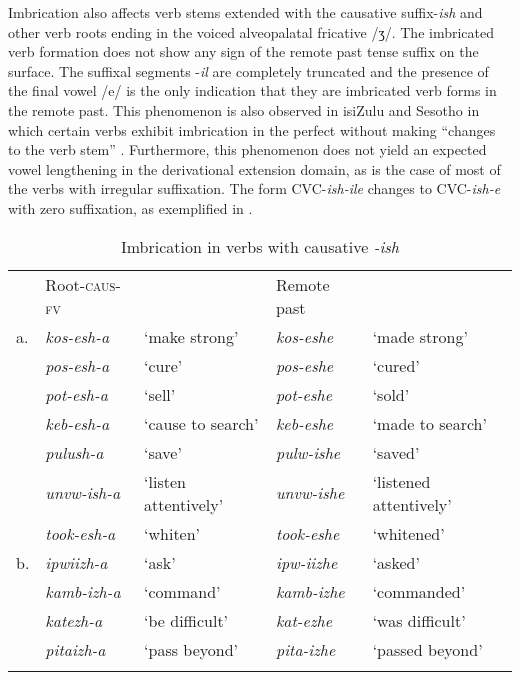 \documentclass[output=paper]{langsci/langscibook}
\begin{document}
Imbrication also affects verb stems extended with the causative suffix-\textit{ish} and other verb roots ending in the voiced alveopalatal fricative /ʒ/. The imbricated verb formation does not show any sign of the remote past tense suffix on the surface. The suffixal segments -\textit{il} are completely truncated and the presence of the final vowel /e/ is the only indication that they are imbricated verb forms in the remote past. This phenomenon is also observed in isiZulu and Sesotho in which certain verbs exhibit imbrication in the perfect without making “changes to the verb stem” \citep{monich2015}. Furthermore, this phenomenon does not yield an expected vowel lengthening in the derivational extension domain, as is the case of most of the verbs with irregular suffixation. The form CVC-\textit{ish-ile} changes to CVC-\textit{ish-e} with zero suffixation, as exemplified in .

\begin{table}
\begin{tabular}{lllll}
\lsptoprule
 & Root-\textsc{caus}-\textsc{fv} &  & Remote past & \\
a. & \textit{kos-esh-a} & `make strong' & \textit{kos-eshe} & `made strong' \\
 & \textit{pos-esh-a} & `cure' & \textit{pos-eshe} & `cured' \\
 & \textit{pot-esh-a} & `sell' & \textit{pot-eshe} & `sold' \\
 & \textit{keb-esh-a} & `cause to search' & \textit{keb-eshe} & `made to search' \\
 & \textit{pulush-a} & `save' & \textit{pulw-ishe} & `saved' \\
 & \textit{unvw-ish-a} & `listen attentively' & \textit{unvw-ishe} & `listened attentively' \\
 & \textit{took-esh-a} & `whiten' & \textit{took-eshe} & `whitened' \\

b. & \textit{ipwiizh-a} & `ask' & \textit{ipw-iizhe} & `asked' \\
 & \textit{kamb-izh-a} & `command' & \textit{kamb-izhe} & `commanded' \\
 & \textit{katezh-a} & `be difficult' & \textit{kat-ezhe} & `was difficult' \\
 & \textit{pitaizh-a} & `pass beyond' & \textit{pita-izhe} & `passed beyond' \\

\lspbottomrule
\end{tabular}

\caption{Imbrication in verbs with causative \textit{-ish}}
\label{tab:24.kawasha}

\end{table}
\end{document}
